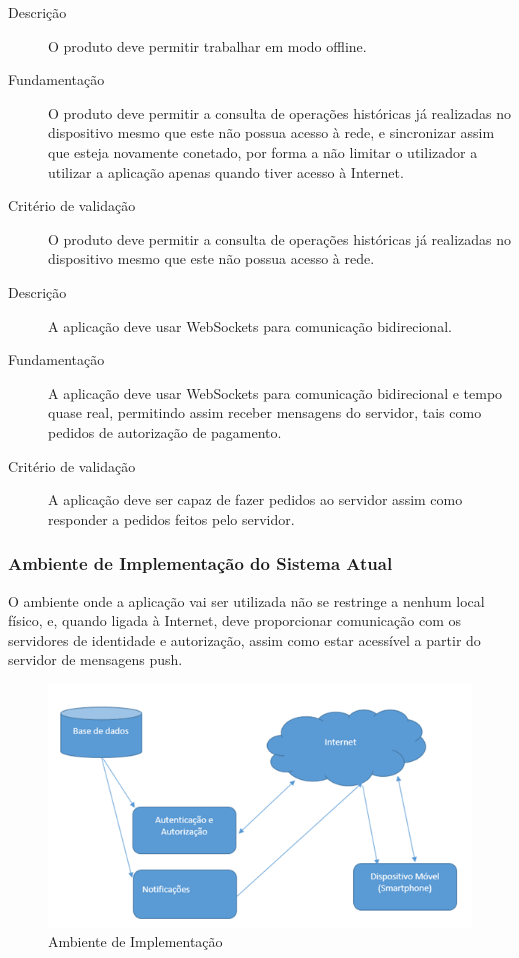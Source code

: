 \documentclass[12pt,a4paper]{article}
\begin{document}
      \begin{description}
        \item[Descrição]O produto deve permitir trabalhar em modo offline.
        \item[Fundamentação]O produto deve permitir a consulta de operações históricas já realizadas no dispositivo mesmo que este não possua acesso à rede, e sincronizar assim que esteja novamente conetado, por forma a não limitar o utilizador a utilizar a aplicação apenas quando tiver acesso à Internet.
        \item[Critério de validação]O produto deve permitir a consulta de operações históricas já realizadas no dispositivo mesmo que este não possua acesso à rede.
      \end{description}

\vspace{0.7cm}
      \begin{description}
        \item[Descrição]A aplicação deve usar WebSockets para comunicação bidirecional.
        \item[Fundamentação]A aplicação deve usar WebSockets para comunicação bidirecional e tempo quase real, permitindo assim receber mensagens do servidor, tais como pedidos de autorização de pagamento.
        \item[Critério de validação]A aplicação deve ser capaz de fazer pedidos ao servidor assim como responder a pedidos feitos pelo servidor.
      \end{description}


    \subsubsection{Ambiente de Implementação do Sistema Atual}

      O ambiente onde a aplicação vai ser utilizada não se restringe a nenhum local físico, e, quando ligada à Internet, deve proporcionar comunicação com os servidores de identidade e autorização, assim como estar acessível a partir do servidor de mensagens push.

      \begin{figure}[ht!]
        \centering
          \includegraphics[width=0.7\linewidth]{img/img2}
          \caption{Ambiente de Implementação}
          \label{img2}
      \end{figure}
\end{document}
